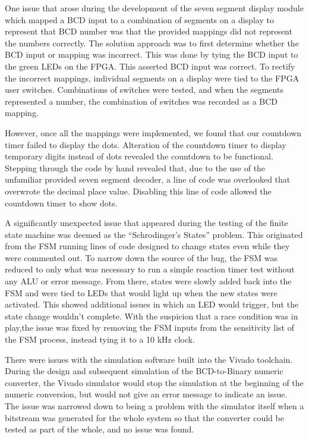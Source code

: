 \documentclass[11pt]{article}
\begin{document}
One issue that arose during the development of the seven segment display module which mapped a BCD input to a combination of segments on a display to represent that BCD number was that the provided mappings did not represent the numbers correctly. The solution approach was to first determine whether the BCD input or mapping was incorrect. This was done by tying the BCD input to the green LEDs on the FPGA. This asserted BCD input was correct. To rectify the incorrect mappings, individual segments on a display were tied to the FPGA user switches. Combinations of switches were tested, and when the segments represented a number, the combination of switches was recorded as a BCD mapping.

However, once all the mappings were implemented, we found that our countdown timer failed to display the dots. Alteration of the countdown timer to display temporary digits instead of dots revealed the countdown to be functional. Stepping through the code by hand revealed that, due to the use of the unfamiliar provided seven segment decoder, a line of code was overlooked that overwrote the decimal place value. Disabling this line of code allowed the countdown timer to show dots.

A significantly unexpected issue that appeared during the testing of the finite state machine was deemed as the ``Schrodinger's States'' problem. This originated from the FSM running lines of code designed to change states even while they were commented out. To narrow down the source of the bug, the FSM was reduced to only what was necessary to run a simple reaction timer test without any ALU or error message. From there, states were slowly added back into the FSM and were tied to LEDs that would light up when the new states were activated. This showed additional issues in which an LED would trigger, but the state change wouldn't complete. With the suspicion that a race condition was in play,the issue was fixed by removing the FSM inputs from the sensitivity list of the FSM process, instead tying it to a 10 kHz clock.

There were issues with the simulation software built into the Vivado toolchain. During the design and subsequent simulation of the BCD-to-Binary numeric converter, the Vivado simulator would stop the simulation at the beginning of the numeric conversion, but would not give an error message to indicate an issue. The issue was narrowed down to being a problem with the simulator itself when a bitstream was generated for the whole system so that the converter could be tested as part of the whole, and no issue was found.
\end{document}
